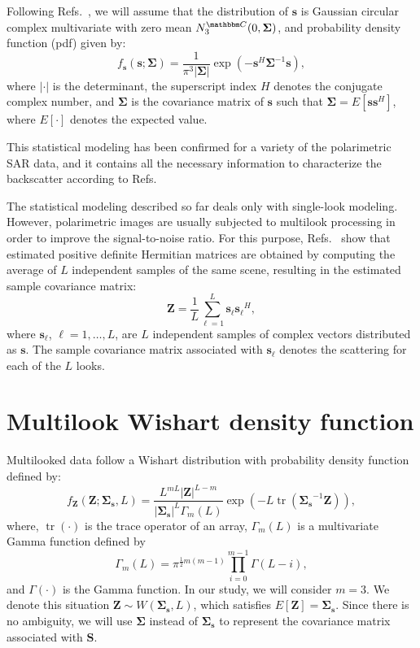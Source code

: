 \documentclass[conference]{IEEEtran}
\DeclareMathOperator{\traco}{tr}
\begin{document}
Following Refs.~\cite{good, lee}, we will assume that the distribution of $\mathbf{s}$ is Gaussian circular complex multivariate with zero mean $N^{\mathbbm C}_3(0,\mathbf{\Sigma})$, and probability density function (pdf) given by:
\begin{equation}
    f_{\mathbf{s}}(\mathbf{s};\mathbf{\Sigma})=\frac{1}{\pi^3|\mathbf{\Sigma}|} \exp(-\mathbf{s}^H\mathbf{\Sigma}^{-1}\mathbf{s}),
    \label{eq_02}
\end{equation}
where $|\cdot|$ is the determinant, 
the superscript index $H$ denotes the conjugate complex number, 
and $\mathbf{\Sigma}$ is the covariance matrix of $\mathbf{s}$ such that $\mathbf{\Sigma}=E[\mathbf{ss}^H]$, where $E[\cdot]$ denotes the expected value. 

This statistical modeling has been confirmed for a variety of the polarimetric SAR data, and it contains all the necessary information to characterize the backscatter according to Refs.~\cite{sarabendi,mfp}
 
The statistical modeling described so far deals only with single-look modeling.
However, polarimetric images are usually subjected to multilook processing in order to improve the signal-to-noise ratio. 
For this purpose, Refs.~\cite{good, ade} show that estimated positive definite Hermitian matrices are obtained by computing the average of $L$ independent samples of the same scene, resulting in the estimated sample covariance matrix:
\begin{equation}
    \mathbf{Z}=\frac{1}{L}\sum_{\ell=1}^{L} {\mathbf{s}_\ell}{\mathbf{s}_\ell}^H,
    \label{eq_03}
\end{equation}
where $\mathbf{s}_\ell$, $\ell = 1, \dots, L$, are $L$ independent samples of complex vectors distributed as $\mathbf{s}$. 
The sample covariance matrix associated with $\mathbf{s}_\ell$ denotes the scattering for each of the $L$ looks.

\section{Multilook Wishart density function}\label{sec_03}

Multilooked data follow a Wishart distribution with probability density function defined by:
\begin{equation}
    f_{\mathbf{Z}}(\mathbf{Z};\mathbf{\Sigma_{s}},L)=\frac{L^{mL}|\mathbf{Z}|^{L-m}}{|\mathbf{\Sigma_{s}}|^{L}\Gamma_m(L)} \exp(-L\traco(\mathbf{\Sigma_{s}}^{-1}\mathbf{Z})),
    \label{eq_04}
\end{equation} 
where, $\traco(\cdot)$ is the trace operator of an array, $\Gamma_m(L)$ is a multivariate Gamma function defined by
\begin{equation*}
	\Gamma_m(L)=\pi^{\frac{1}{2}m(m-1)} \prod_{i=0}^{m-1}\Gamma(L-i),
\end{equation*}
and $\Gamma(\cdot)$ is the Gamma function.
In our study, we will consider $m=3$. 
We denote this situation $\mathbf{Z}\sim W(\mathbf{\Sigma_{s}}, L)$, which satisfies $E[\mathbf{Z}]=\mathbf{\Sigma_{s}}$. 
Since there is no ambiguity, we will use $\mathbf{\Sigma}$ instead of $\mathbf{\Sigma_{s}}$ to represent the covariance matrix associated with $\mathbf{S}$.
\end{document}

